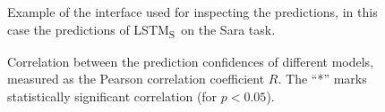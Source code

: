 \documentclass[bsc,frontabs,singlespacing,parskip,deptreport]{infthesis}
\def\LSTMS{LSTM\textsubscript{S}}
\begin{document}
{{    \begin{figure}[h!tb]
      \centering
      \caption{Example of the interface used for inspecting the predictions, in this case the predictions of \LSTMS~on the Sara task.}
      \label{fig:prediction-analysis-example}
    \end{figure}
    
    \begin{figure}[h!tb]
      \centering
      \caption{Correlation between the prediction confidences of different models, measured as the Pearson correlation coefficient $R$. The ``*'' marks statistically significant correlation (for $p < 0.05$).}
      \label{fig:confidence-correlation}
    \end{figure}

}}
\end{document}
